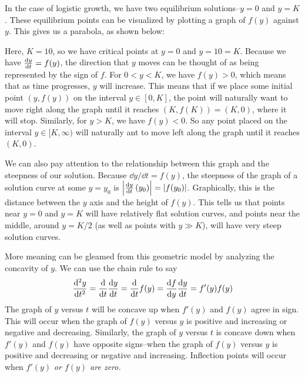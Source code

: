 \begin{example}
    In the case of logistic growth, we have two equilibrium solutions--$y=0$ and $y = K$. These equilibrium points can be visualized by plotting a graph of $f(y)$ against $y$. This gives us a parabola, as shown below:
    \begin{figure}[h!]
        \centering
    \end{figure}
Here, $K = 10$, so we have critical points at $y=0$ and $y=10=K$. Because we have $\dv{y}{t} = f(y)$, the direction that $y$ moves can be thought of as being represented by the sign of $f$. For $0 < y < K$, we have $f(y) > 0$, which means that as time progresses, $y$ will increase. This means that if we place some initial point $(y, f(y))$ on the interval $y \in [0, K]$, the point will naturally want to move right along the graph until it reaches $(K, f(K)) = (K, 0)$, where it will stop. Similarly, for $y > K$, we have $f(y) < 0$. So any point placed on the interval $y\in [K, \infty)$ will naturally ant to move left along the graph until it reaches $(K,0)$. \par
We can also pay attention to the relationship between this graph and the steepness of our solution. Because $\dd y/\dd t = f(y)$, the steepness of the graph of a solution curve at some $y=y_0$ is $\abs{\dv{y}{t} \,(y_0)} = \abs{f(y_0)}$. Graphically, this is the distance between the $y$ axis and the height of $f(y)$. This tells us that points near $y=0$ and $y=K$ will have relatively flat solution curves, and points near the middle, around $y=K/2$ (as well as points with $y \gg K$), will have very steep solution curves. \par
More meaning can be gleamed from this geometric model by analyzing the concavity of $y$. We can use the chain rule to say
\[ \dv[2]{y}{t} = \dv{t} \dv{y}{t} = \dv{t} f(y) = \dv{f}{y}\dv{y}{t} = f'(y)f(y) \]
The graph of $y$ versus $t$ will be concave up when $f'(y)$ and $f(y)$ agree in sign. This will occur when the graph of $f(y)$ versus $y$ is positive and increasing or negative and decreasing. Similarly, the graph of $y$ versus $t$ is concave down when $f'(y)$ and $f(y)$ have opposite signs--when the graph of $f(y)$ versus $y$ is positive and decreasing or negative and increasing. Inflection points will occur when $f'(y)$ \it{or} $f(y)$ are zero. \par

\end{example}
